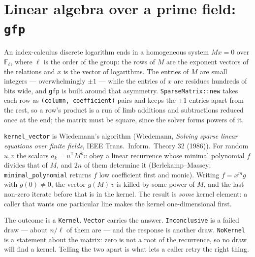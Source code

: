 \documentclass[11pt]{article}
\newcommand{\code}[1]{\texttt{#1}}
\newcommand{\F}{\mathbb{F}}
\begin{document}
\section{Linear algebra over a prime field: \code{gfp}}
\label{sec:gfp}

An index-calculus discrete logarithm ends in a homogeneous system
$M x = 0$ over $\F_\ell$, where $\ell$ is the order of the group: the rows
of $M$ are the exponent vectors of the relations and $x$ is the vector of
logarithms. The entries of $M$ are small integers --- overwhelmingly
$\pm 1$ --- while the entries of $x$ are residues hundreds of bits wide,
and \code{gfp} is built around that asymmetry. \code{SparseMatrix::new}
takes each row as \code{(column, coefficient)} pairs and keeps the $\pm 1$
entries apart from the rest, so a row's product is a run of limb additions
and subtractions reduced once at the end; the matrix must be square, since
the solver forms powers of it.

\code{kernel\_vector} is Wiedemann's algorithm (Wiedemann, \emph{Solving
sparse linear equations over finite fields}, IEEE Trans.\ Inform.\ Theory
32 (1986)). For random $u, v$ the scalars $a_k = u^{\mathsf T} M^k v$
obey a linear recurrence whose minimal polynomial $f$ divides that of $M$,
and $2n$ of them determine it (Berlekamp--Massey; \code{minimal\_polynomial}
returns $f$ low coefficient first and monic). Writing $f = x^m g$ with
$g(0) \ne 0$, the vector $g(M)\,v$ is killed by some power of $M$, and the
last non-zero iterate before that is in the kernel. The result is
\emph{some} kernel element: a caller that wants one particular line makes
the kernel one-dimensional first.

The outcome is a \code{Kernel}. \code{Vector} carries the answer.
\code{Inconclusive} is a failed draw --- about $n/\ell$ of them are --- and
the response is another draw. \code{NoKernel} is a statement about the
matrix: zero is not a root of the recurrence, so no draw will find a kernel.
Telling the two apart is what lets a caller retry the right thing.
\end{document}
